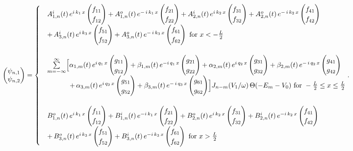 \documentclass[aps,prb,onecolumn,longbibliography,nofootinbib,citeautoscript,10pt]{revtex4-2}
\newcommand\pmtx[1]{\begin{pmatrix}#1\end{pmatrix}} %
\begin{document}
\begin{align} 
\label{eq:psi_j3}
\pmtx{\psi_{n,1}  \\ \psi_{n,2} } =
\begin{cases}
& A_{1,n}^{i}(t) \,e^{i \, k_1 \, x} \pmtx{f_{11} \\ f_{12}}
	+ A_{1,n}^{o}(t) \,e^{- \, i \, k_1 \, x} \pmtx{f_{21} \\ f_{22}}
	+ A_{2,n}^{i}(t) \,e^{ i \,k_2\, x} \pmtx{f_{31} \\ f_{32}}
	+ A_{2,n}^{o}(t) \,e^{ -\,i \,k_2 \, x} \pmtx{f_{41} \\ f_{42}}
\\ & 	+ \, A_{3,n}^{i}(t) \,e^{ i \,k_3 \, x} \pmtx{f_{51} \\ f_{52}}
	+ A_{3,n}^{o}(t) \,e^{ - \, i \,k_3 \, x} \pmtx{f_{61} \\ f_{62}}
\text{ for } x< -\frac{L} {2} \\ & \\
& \sum \limits _{m=-\infty}^\infty 
\Bigl[ \alpha_{1,m}(t) \,e^{i \, q_1 \, x} \pmtx{g_{11} \\ g_{12}}
	+ \beta_{1,m}(t) \,e^{-i \, q_1 \, x} \pmtx{g_{21} \\ g_{22}}
	+ \alpha_{2,m}(t) \,e^{i \, q_2 \, x} \pmtx{g_{31} \\ g_{32}}
	+ \beta_{2,m}(t) \,e^{- \,i \, q_2 \, x} \pmtx{g_{41} \\ g_{42}}
\\ & \qquad \quad \;	+\, \alpha_{3,m}(t) \,e^{i \, q_3 \, x} \pmtx{g_{51} \\ g_{52}}
	+ \beta_{3,m}(t) \,e^{-\, i \, q_3 \, x} \pmtx{g_{61} \\ g_{62}} \Bigr]
J_{n-m} ({V_{1}} / {\omega}) \, \Theta(-E_m-V_0)
 \text{ for } -\frac{L} {2} \le x \le \frac{L} {2} \\ & \\
&	B_{1,n}^{o}(t) \,e^{i \, k_1 \, x} \pmtx{f_{11} \\ f_{12}}
	+ B_{1,n}^{i}(t) \,e^{-i \, k_1 \, x} \pmtx{f_{21} \\ f_{22}}
	+ B_{2,n}^{o}(t) \,e^{ i \,k_2 \, x} \pmtx{f_{31} \\ f_{32}}
	+ B_{2,n}^{i}(t) \,e^{ -i \,k_2 \, x} \pmtx{f_{41} \\ f_{42}}
\\ & 	+ \, B_{3,n}^{o}(t) \,e^{ i \,k_3 \, x} \pmtx{f_{51} \\ f_{52}}
	+ B_{3,n}^{i}(t) \,e^{ -i \,k_3 \, x} \pmtx{f_{61} \\ f_{62}}
 \text{ for } x> \frac{L} {2}
\end{cases}.
\end{align}
\end{document}
